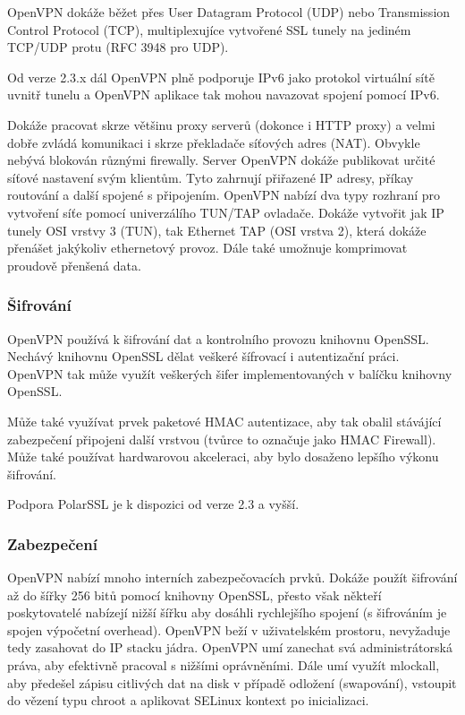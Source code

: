 \documentclass[thesis=B,czech]{FITthesis}[2012/06/26]
\begin{document}
        OpenVPN dokáže běžet přes User Datagram Protocol (UDP) nebo Transmission Control Protocol (TCP), multiplexujíce vytvořené SSL tunely na jediném TCP/UDP protu\cite{openvpn_tls_mode_options} (RFC 3948 pro UDP).\cite{openvpn_udp}

        Od verze 2.3.x dál OpenVPN plně podporuje IPv6 jako protokol virtuální sítě uvnitř tunelu a OpenVPN aplikace tak mohou navazovat spojení pomocí IPv6.\cite{openvpn_community_wiki}

        Dokáže pracovat skrze většinu proxy serverů (dokonce i HTTP proxy) a velmi dobře zvládá komunikaci i skrze překladače síťových adres (NAT). Obvykle nebývá blokován různými firewally.
        Server OpenVPN dokáže publikovat určité síťové nastavení svým klientům. Tyto zahrnují přiřazené IP adresy, příkay routování a další spojené s připojením.
        OpenVPN nabízí dva typy rozhraní pro vytvoření síťe pomocí univerzálího TUN/TAP ovladače. Dokáže vytvořit jak IP tunely OSI vrstvy 3 (TUN), tak Ethernet TAP (OSI vrstva 2), která dokáže přenášet jakýkoliv ethernetový provoz. Dále také umožnuje komprimovat proudově přenšená data.

      \subsubsection{Šifrování}
        OpenVPN používá k šifrování dat a kontrolního provozu knihovnu OpenSSL. Nechávý knihovnu OpenSSL dělat veškeré šífrovací i autentizační práci. OpenVPN tak může využít veškerých šifer implementovaných v balíčku knihovny OpenSSL.

        Může také využívat prvek paketové HMAC autentizace, aby tak obalil stávájící zabezpečení připojeni další vrstvou (tvůrce to označuje jako HMAC Firewall). Může také používat hardwarovou akceleraci, aby bylo dosaženo lepšího výkonu šifrování.\cite{openvpn_enc_1}\cite{openvpn_enc_2}

        Podpora PolarSSL je k dispozici od verze 2.3 a vyšší.\cite{openvpn_enc_3}

	  \subsubsection{Zabezpečení}
	  
		OpenVPN nabízí mnoho interních zabezpečovacích prvků. Dokáže použít šifrování až do šířky 256 bitů pomocí knihovny OpenSSL, přesto však někteří poskytovatelé nabízejí nižší šířku aby dosáhli rychlejšího spojení (s šifrováním je spojen výpočetní overhead).\cite{openvpn_sec}
		OpenVPN beží v uživatelském prostoru, nevyžaduje tedy zasahovat do IP stacku jádra. OpenVPN umí zanechat svá administrátorská práva, aby efektivně pracoval s nižšími oprávněními. Dále umí využít mlockall, aby předešel zápisu citlivých dat na disk v případě odložení (swapování), vstoupit do vězení typu chroot a aplikovat SELinux kontext po inicializaci.
\end{document}

